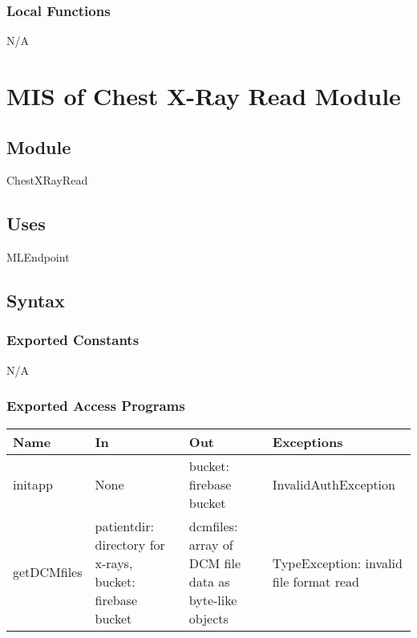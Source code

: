 \documentclass[12pt, titlepage]{article}
\begin{document}

\subsubsection{Local Functions}
N/A

\newpage

\section{MIS of Chest X-Ray Read Module} \label{mChXRR} 

\subsection{Module}
ChestXRayRead

\subsection{Uses}
MLEndpoint

\subsection{Syntax}

\subsubsection{Exported Constants}
N/A

\subsubsection{Exported Access Programs}

\begin{center}
  \begin{tabular}{p{3cm} p{4cm} p{4cm} p{5cm}}
    \hline
    \textbf{Name} & \textbf{In} & \textbf{Out} & \textbf{Exceptions} \\
    \hline
    initapp & None & bucket: firebase bucket & InvalidAuthException \\
    getDCMfiles & patientdir: directory for x-rays, bucket: firebase bucket & dcmfiles: array of DCM file data as byte-like objects & TypeException: invalid file format read \\
    \hline
  \end{tabular}
\end{center}
\end{document}
